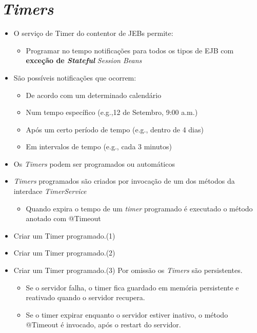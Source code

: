\documentclass{article}
\begin{document}
\section{\textit{Timers}}

\begin{itemize}
    \item O serviço de Timer do contentor de JEBs permite:
    \begin{itemize}
        \item Programar no tempo notificações para todos os tipos de EJB com \textbf{exceção de \textit{Stateful}} \textit{Session Beans}
    \end{itemize}
    \item São possíveis notificações que ocorrem:
    \begin{itemize}
        \item De acordo com um determinado calendário
        \item Num tempo específico (e.g.,12 de Setembro, 9:00 a.m.)
        \item Após um certo período de tempo (e.g., dentro de 4 dias)
        \item Em intervalos de tempo (e.g., cada 3 minutos)
    \end{itemize}
    \item Os \textit{Timers} podem ser programados ou automáticos
    \item \textit{Timers} programados são criados por invocação de um dos métodos da interdace \textit{TimerService}
    \begin{itemize}
        \item Quando expira o tempo de um \textit{timer} programado é executado o método anotado com @Timeout 
    \end{itemize}
    \item Criar um Timer programado.(1)
    \item Criar um Timer programado.(2)
    \item Criar um Timer programado.(3)
    Por omissão os \textit{Timers} são persistentes.
    \begin{itemize}
        \item Se o servidor falha, o timer fica guardado em memória persistente e reativado quando o servidor recupera.
        \item Se o timer expirar enquanto o servidor estiver inativo, o método @Timeout é invocado, após o restart do servidor.
    \end{itemize}
\end{itemize}
\end{document}
